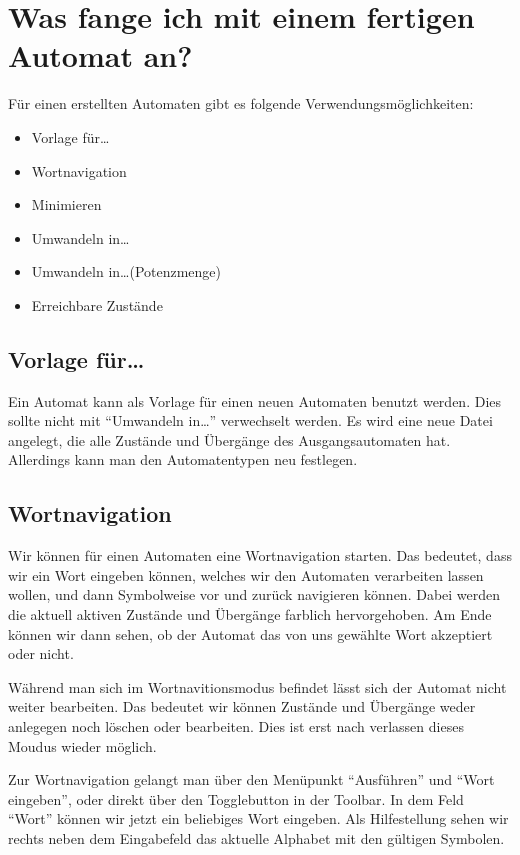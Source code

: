 \section{Was fange ich mit einem fertigen Automat an?}

Für einen erstellten Automaten gibt es folgende
Ver\-wen\-dungs\-möglich\-keiten:

\begin{itemize}
  \item Vorlage für\ldots
  \item Wortnavigation
  \item Minimieren
  \item Umwandeln in\ldots
  \item Umwandeln in\ldots (Potenzmenge)
  \item Erreichbare Zustände
\end{itemize}

\subsection{Vorlage für\ldots}
  
  Ein Automat kann als Vorlage für einen neuen Automaten benutzt werden. Dies
  sollte nicht mit "`Umwandeln in\ldots"' verwechselt werden. Es wird eine neue
  Datei angelegt, die alle Zustände und Übergänge des Ausgangsautomaten hat.
  Allerdings kann man den Automatentypen neu festlegen.
  
\subsection{Wortnavigation}
  
  Wir können für einen Automaten eine Wortnavigation starten. Das bedeutet,
  dass wir ein Wort eingeben können, welches wir den Automaten verarbeiten
  lassen wollen, und dann Symbolweise vor und zurück navigieren können. Dabei
  werden die aktuell aktiven Zustände und Übergänge farblich hervorgehoben. Am
  Ende können wir dann sehen, ob der Automat das von uns gewählte Wort
  akzeptiert oder nicht.\vspace{10pt}
  
  Während man sich im Wortnavitionsmodus
  befindet lässt sich der Automat nicht weiter bearbeiten. Das bedeutet
  wir können Zustände und Übergänge weder anlegegen noch löschen
  oder bearbeiten. Dies ist erst nach verlassen dieses Moudus wieder
  möglich.\vspace{10pt}
  
  Zur Wortnavigation gelangt man über den Menüpunkt "`Ausführen"' und "`Wort
  eingeben"', oder direkt über den Togglebutton in der Toolbar. In dem
  Feld "`Wort"' können wir jetzt ein beliebiges Wort eingeben. Als
  Hilfestellung sehen wir rechts neben dem Eingabefeld das aktuelle Alphabet
  mit den gültigen Symbolen.\vspace{10pt}
  
